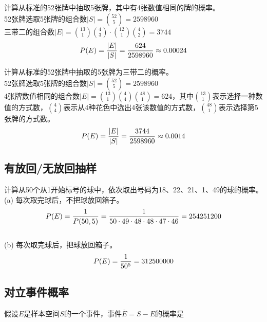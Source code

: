 \begin{tcolorbox}
	计算从标准的52张牌中抽取5张牌，其中有4张数值相同的牌的概率。\\
	52张牌选取5张牌的组合数$ |S| = {52 \choose 5} = 2598960 $\\
	三带二的组合数$ |E| = {13 \choose 1}{4 \choose 3} \cdot {12 \choose 1}{4 \choose 2} = 3744 $\\
	$$
		P(E) = {|E| \over |S|} = {624 \over 2598960} \approx 0.00024
	$$
\end{tcolorbox}

\begin{tcolorbox}
	计算从标准的52张牌中抽取的5张牌为三带二的概率。\\
	52张牌选取5张牌的组合数$ |S| = {52 \choose 5} = 2598960 $\\
	4张牌数值相同的组合数$ |E| = {13 \choose 1}{4 \choose 4}{48 \choose 1} = 624 $，其中$ 13 \choose 1 $表示选择一种数值的方式数，$ 4 \choose 4 $表示从4种花色中选出4张该数值的方式数，$ 48 \choose 1 $表示选择第5张牌的方式数。\\
	$$
		P(E) = {|E| \over |S|} = {3744 \over 2598960} \approx 0.0014
	$$
\end{tcolorbox}

\vspace{0.5cm}

\subsection{有放回/无放回抽样}

\begin{tcolorbox}
	计算从50个从1开始标号的球中，依次取出号码为18、22、21、1、49的球的概率。\\
	(a) 每次取完球后，不把球放回箱子。\\
	$$
		P(E) = {1 \over P(50, 5)} = {1 \over {50 \cdot 49 \cdot 48 \cdot 48 \cdot 47 \cdot 46}} = 254251200
	$$
	\\
	(b) 每次取完球后，把球放回箱子。\\
	$$
		P(E) = {1 \over 50^5} = 312500000
	$$
\end{tcolorbox}

\vspace{0.5cm}

\subsection{对立事件概率}

假设$ E $是样本空间$ S $的一个事件，事件$ \overline{E} = S - E $的概率是

